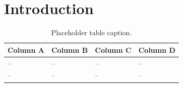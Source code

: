 \documentclass[HARVARD,LATO2COL]{WileyNJDv5}
\begin{document}
\title{}

\author[1]{}
\address[1]{\orgdiv{}, \orgname{}, \orgaddress{\state{}, \country{}}}

\authormark{}
\titlemark{}

\corres{\email{}}

\abstract[Abstract]{}

\keywords{}

\maketitle


\section{Introduction}\label{sec:intro}

\begin{table}[!h]%
\caption{Placeholder table caption.\label{tab:placeholder}}
\begin{tabular*}{\textwidth}{@{\extracolsep\fill}llll@{}}
\toprule
Column A & Column B & Column C & Column D \\
\midrule
-- & -- & -- & -- \\
-- & -- & -- & -- \\
\bottomrule
\end{tabular*}
\end{table}
\end{document}
